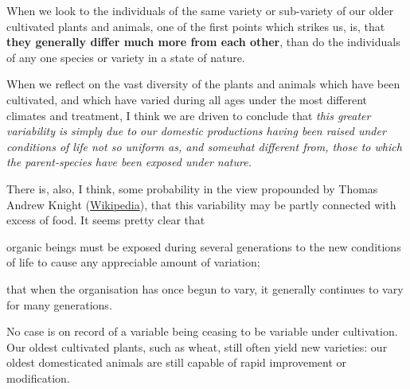 When we look to the individuals of the same variety or sub-variety of our older cultivated plants and animals, one of the first points which strikes us, is, that \textbf{they generally differ much more from each other}, than do the individuals of any one species or variety in a state of nature.

When we reflect on the vast diversity of the plants and animals which have been cultivated, and which have varied during all ages under the most different climates and treatment, I think we are driven to conclude that \textit{this greater variability is simply due to our domestic productions having been raised under conditions of life not so uniform as, and somewhat different from, those to which the parent-species have been exposed under nature.}

There is, also, I think, some probability in the view propounded by Thomas Andrew Knight (\href{http://en.wikipedia.org/wiki/Main_Page}{Wikipedia}), that this variability may be partly connected with excess of food. It seems pretty clear that

organic beings must be exposed during several generations to the new conditions of life to cause any appreciable amount of variation;

that when the organisation has once begun to vary, it generally continues to vary for many generations.

No case is on record of a variable being ceasing to be variable under cultivation. Our oldest cultivated plants, such as wheat, still often yield new varieties: our oldest domesticated animals are still capable of rapid improvement or modification.